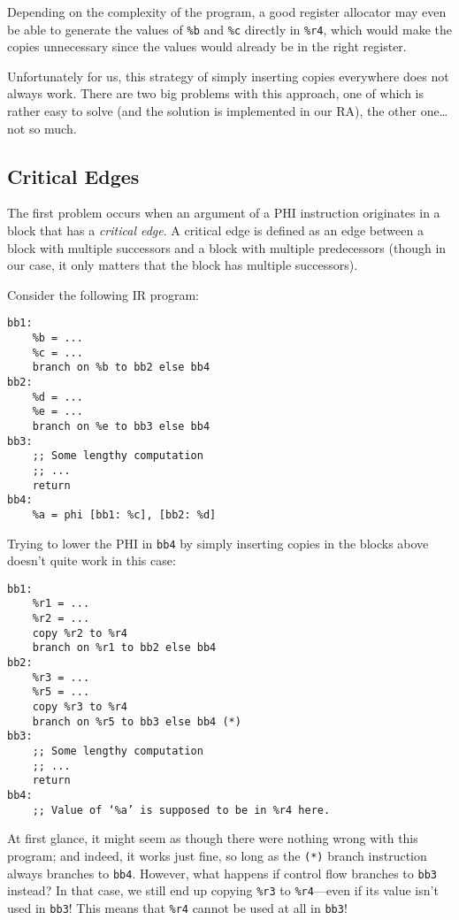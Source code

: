 \documentclass[12pt]{report}
\begin{document}
\noindent Depending on the complexity of the program, a good register allocator may even be able to generate the values of \verb|%b| and
\verb|%c| directly in \verb|%r4|, which would make the copies unnecessary since the values would already be in the right register.

Unfortunately for us, this strategy of simply inserting copies everywhere does not always work. There are two big problems with this
approach, one of which is rather easy to solve (and the solution is implemented in our RA), the other one\ldots{} not so much.

\subsection{Critical Edges}
The first problem occurs when an argument of a PHI instruction originates in a block that has a \textit{critical edge}. A critical edge is
defined as an edge between a block with multiple successors and a block with multiple predecessors (though in our case, it only matters
that the block has multiple successors). 

Consider the following IR program:
\begin{Verbatim}
bb1:
    %b = ...
    %c = ...
    branch on %b to bb2 else bb4
bb2:
    %d = ...
    %e = ...
    branch on %e to bb3 else bb4
bb3:
    ;; Some lengthy computation
    ;; ...
    return
bb4:
    %a = phi [bb1: %c], [bb2: %d]
\end{Verbatim}

\noindent Trying to lower the PHI in \verb|bb4| by simply inserting copies in the blocks above doesn't quite work in this case:
\begin{Verbatim}
bb1:
    %r1 = ...
    %r2 = ...
    copy %r2 to %r4
    branch on %r1 to bb2 else bb4
bb2:
    %r3 = ...
    %r5 = ...
    copy %r3 to %r4
    branch on %r5 to bb3 else bb4 (*)
bb3:
    ;; Some lengthy computation
    ;; ...
    return
bb4:
    ;; Value of ‘%a’ is supposed to be in %r4 here.
\end{Verbatim}

\noindent At first glance, it might seem as though there were nothing wrong with this program; and indeed, it works just fine, so long
as the \verb|(*)| branch instruction always branches to \verb|bb4|. However, what happens if control flow branches to \verb|bb3| instead? 
In that case, we still end up copying \verb|%r3| to \verb|%r4|—even if its value isn't used in \verb|bb3|! This means that \verb|%r4| 
cannot be used at all in \verb|bb3|! 
\end{document}
